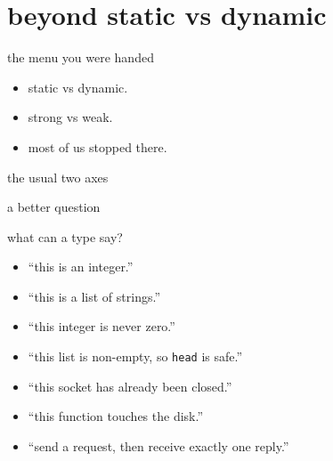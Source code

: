   \section{beyond static vs dynamic}
  \begin{frame}{the menu you were handed}
    \begin{itemize}
      \item static vs dynamic.
      \item strong vs weak.
      \item \textcolor{mute}{most of us stopped there.}
    \end{itemize}
  \end{frame}

  \begin{frame}{the usual two axes}
  \end{frame}

  \begin{frame}{a better question}
  \end{frame}

  \begin{frame}{what can a type say?}
    \begin{itemize}
      \item[\textcolor{mute}{\textbar}] \textcolor{mute}{“this is an integer.”}
      \item[\textcolor{mute}{\textbar}] \textcolor{mute}{“this is a list of strings.”}
      \item “this integer is never zero.”
      \item “this list is non-empty, so \texttt{head} is safe.”
      \item “this socket has already been closed.”
      \item “this function touches the disk.”
      \item “send a request, then receive exactly one reply.”
    \end{itemize}
    \vspace{0.4em}
  \end{frame}


